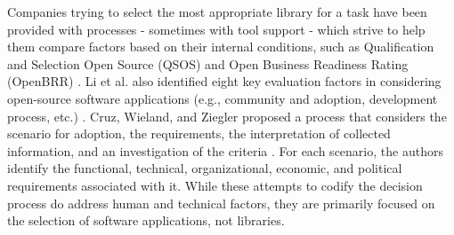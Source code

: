 Companies trying to select the most appropriate library for a task have been provided with processes - sometimes with tool support - which strive to help them compare factors based on their internal conditions, such as Qualification and Selection Open Source (QSOS) and Open Business Readiness Rating (OpenBRR) \cite{deprez2008comparing, semeteys2008method, wasserman2017osspal}. Li et al. also identified eight key evaluation factors in considering open-source software applications (e.g., community and adoption, development process, etc.) \cite{li2022exploring}.  Cruz, Wieland, and Ziegler proposed a process that considers the scenario for adoption, the requirements, the interpretation of collected information, and an investigation of the criteria \cite{cruz2006evaluation}. For each scenario, the authors identify the functional, technical, organizational, economic, and political requirements associated with it. While these attempts to codify the decision process do address human and technical factors, they are primarily focused on the selection of software applications, not libraries.
